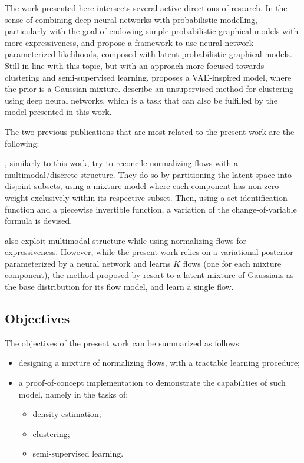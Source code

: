 The work presented here intersects several active directions of research.
In the sense of combining deep neural networks with probabilistic modelling,
particularly with the goal of endowing simple probabilistic graphical models
with more expressiveness, \textcite{svae} and \textcite{lin2018variational} propose a
framework to use neural-network-parameterized likelihoods, composed with latent
probabilistic graphical models. Still in line with this topic, but with an
approach more focused towards clustering and semi-supervised learning, \textcite{gmVAE}
proposes a VAE-inspired model, where the prior is a Gaussian mixture. \textcite{DEC}
describe an unsupervised method for clustering using deep neural networks, which
is a task that can also be fulfilled by the model presented in this work.

The two previous publications that are most related to the present work are
the following:

\textcite{RAD}, similarly to this work, try to reconcile normalizing flows with a
multimodal/discrete structure. They do so by partitioning the latent space into
disjoint subsets, using a mixture model where each component has non-zero
weight exclusively within its respective subset. Then, using a set identification
function and a piecewise invertible function, a variation of the change-of-variable
formula is devised.

\textcite{semisuplearning_nflows} also exploit multimodal structure while
using normalizing flows for expressiveness. However, while the present work relies on
a variational posterior parameterized by a neural network and learns $K$ flows
(one for each mixture component), the method proposed by \textcite{semisuplearning_nflows} resort to a
latent mixture of Gaussians as the base distribution for its flow model, and
learn a single flow.

\subsection{Objectives}
\label{subsection:objectives}

The objectives of the present work can be summarized as follows:
\begin{itemize}
    \item designing a mixture of normalizing flows, with a tractable learning procedure;
    \item a proof-of-concept implementation to demonstrate the capabilities of such model, namely in the tasks of:
        \begin{itemize}
        \item density estimation;
        \item clustering;
        \item semi-supervised learning.
        \end{itemize}
\end{itemize}

